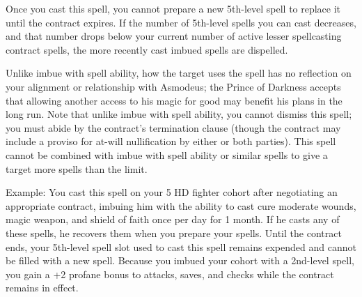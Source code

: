 {Once you cast this spell, you cannot prepare a new 5th-level spell to replace it until the contract expires. If the number of 5th-level spells you can cast decreases, and that number drops below your current number of active lesser spellcasting contract spells, the more recently cast imbued spells are dispelled.

Unlike imbue with spell ability, how the target uses the spell has no reflection on your alignment or relationship with Asmodeus; the Prince of Darkness accepts that allowing another access to his magic for good may benefit his plans in the long run. Note that unlike imbue with spell ability, you cannot dismiss this spell; you must abide by the contract's termination clause (though the contract may include a proviso for at-will nullification by either or both parties). This spell cannot be combined with imbue with spell ability or similar spells to give a target more spells than the limit.

Example: You cast this spell on your 5 HD fighter cohort after negotiating an appropriate contract, imbuing him with the ability to cast cure moderate wounds, magic weapon, and shield of faith once per day for 1 month. If he casts any of these spells, he recovers them when you prepare your spells. Until the contract ends, your 5th-level spell slot used to cast this spell remains expended and cannot be filled with a new spell. Because you imbued your cohort with a 2nd-level spell, you gain a +2 profane bonus to attacks, saves, and checks while the contract remains in effect.}
    
